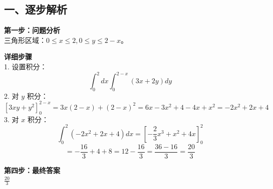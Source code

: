\documentclass[12pt, a4paper]{ctexart}
\newenvironment{RedAnalysis}{
    \par
    \color{red} %
}{
    \par
    \color{black} %
}
\begin{document}
\begin{RedAnalysis}

\subsection*{一、逐步解析}

\textbf{第一步：问题分析} \\
三角形区域：$0 \le x \le 2, 0 \le y \le 2-x$。

\textbf{详细步骤} \\
1. 设置积分：
   \[ \int_0^2 dx \int_0^{2-x} (3x + 2y) dy \]
2. 对 $y$ 积分：
   \[ [3xy + y^2]_0^{2-x} = 3x(2-x) + (2-x)^2 = 6x - 3x^2 + 4 - 4x + x^2 = -2x^2 + 2x + 4 \]
3. 对 $x$ 积分：
   \[ \int_0^2 (-2x^2 + 2x + 4) dx = [-\frac{2}{3}x^3 + x^2 + 4x]_0^2 \]
   \[ = -\frac{16}{3} + 4 + 8 = 12 - \frac{16}{3} = \frac{36-16}{3} = \frac{20}{3} \]

\textbf{第四步：最终答案} \\
$ \frac{20}{3} $

\end{RedAnalysis}
\end{document}
